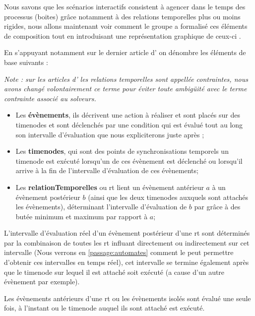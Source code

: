 Nous savons que les scénarios interactifs consistent à agencer dans le temps des processus (boites) grâce notamment à des relations temporelles plus ou moins rigides, nous allons maintenant voir comment le groupe \ossia{} a formalisé ces éléments de composition tout en introduisant une représentation graphique de ceux-ci .

En s'appuyant notamment sur le dernier article d'\ossia{}\cite{ossia2015interface} on dénombre les éléments de base suivants :

\emph{Note : sur les articles d'\ossia{} les relations temporelles sont appellée contraintes, nous avons changé volontairement ce terme pour éviter toute ambigüité avec le terme contrainte associé au solveurs.}

\begin{itemize}

    \item Les \textbf{évènements}, ils décrivent une action à réaliser et sont placés sur des \glspl{timenode} et sont déclenchés par une condition qui est évalué tout au long son intervalle d'évaluation que nous expliciterons juste après ;
    
    \item Les \textbf{\glspl{timenode}}, qui sont des points de synchronisations temporels un \gls{timenode} est exécuté lorsqu'un de ces évènement est déclenché ou lorsqu'il arrive à la fin de l'intervalle d'évaluation de ces évènements;

    \item Les \textbf{\glspl{relationTemporelle}} ou \acrshort{rt} lient un évènement antérieur $a$ à un évènement postérieur $b$ (ainsi que les deux timenodes auxquels sont attachés les évènements), déterminant l'intervalle d'évaluation de $b$ par grâce à des butée minimum et maximum par rapport à $a$;

\end{itemize}

L'intervalle d'évaluation réel d'un évènement postérieur d'une \acrshort{rt} sont déterminés par la combinaison de toutes les \acrshort{rt} influant directement ou indirectement sur cet intervalle (Nous verrons en \autoref{passage:automates} comment le \csp{} peut permettre d'obtenir ces intervalles en temps réel), cet intervalle se termine également après que le \gls{timenode} sur lequel il est attaché soit exécuté (a cause d'un autre évènement par exemple).

Les évènements antérieurs d'une \acrshort{rt} ou les évènements isolés sont évalué une seule fois, à l'instant ou le \gls{timenode} auquel ils sont attaché est exécuté.

